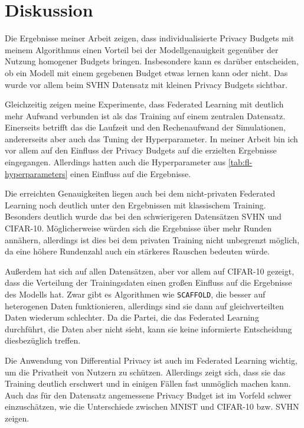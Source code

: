 \chapter{Diskussion}


Die Ergebnisse meiner Arbeit zeigen, dass individualisierte Privacy Budgets mit meinem Algorithmus einen Vorteil bei der Modellgenauigkeit gegenüber der Nutzung homogener Budgets bringen. Insbesondere kann es darüber entscheiden, ob ein Modell mit einem gegebenen Budget etwas lernen kann oder nicht. Das wurde vor allem beim SVHN Datensatz mit kleinen Privacy Budgets sichtbar.

Gleichzeitig zeigen meine Experimente, dass Federated Learning mit deutlich mehr Aufwand verbunden ist als das Training auf einem zentralen Datensatz. Einerseits betrifft das die Laufzeit und den Rechenaufwand der Simulationen, andererseits aber auch das Tuning der Hyperparameter. In meiner Arbeit bin ich vor allem auf den Einfluss der Privacy Budgets auf die erzielten Ergebnisse eingegangen. Allerdings hatten auch die Hyperparameter aus \autoref{tab:fl-hyperparameters} einen Einfluss auf die Ergebnisse.

Die erreichten Genauigkeiten liegen auch bei dem nicht-privaten Federated Learning noch deutlich unter den Ergebnissen mit klassischem Training. Besonders deutlich wurde das bei den schwierigeren Datensätzen SVHN und CIFAR-10. Möglicherweise würden sich die Ergebnisse über mehr Runden annähern, allerdings ist dies bei dem privaten Training nicht unbegrenzt möglich, da eine höhere Rundenzahl auch ein stärkeres Rauschen bedeuten würde.

Außerdem hat sich auf allen Datensätzen, aber vor allem auf CIFAR-10 gezeigt, dass die Verteilung der Trainingsdaten einen großen Einfluss auf die Ergebnisse des Modells hat. Zwar gibt es Algorithmen wie \texttt{SCAFFOLD}, die besser auf heterogenen Daten funktionieren, allerdings sind sie dann auf gleichverteilten Daten wiederum schlechter. Da die Partei, die das Federated Learning durchführt, die Daten aber nicht sieht, kann sie keine informierte Entscheidung diesbezüglich treffen.

Die Anwendung von Differential Privacy ist auch im Federated Learning wichtig, um die Privatheit von Nutzern zu schützen. Allerdings zeigt sich, dass sie das Training deutlich erschwert und in einigen Fällen fast unmöglich machen kann. Auch das für den Datensatz angemessene Privacy Budget ist im Vorfeld schwer einzuschätzen, wie die Unterschiede zwischen MNIST und CIFAR-10 bzw. SVHN zeigen.

